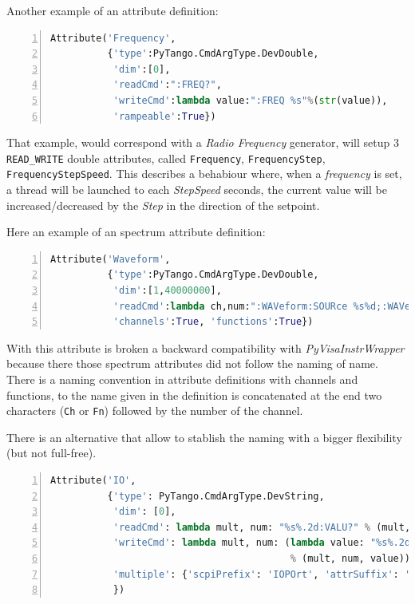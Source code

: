 \documentclass[a4paper,10pt]{article}
\begin{document}
Another example of an attribute definition:

\begin{lstlisting}[language=python, basicstyle=\ttfamily\small\footnotesize, numbers=left]
Attribute('Frequency',
          {'type':PyTango.CmdArgType.DevDouble,
           'dim':[0],
           'readCmd':":FREQ?",
           'writeCmd':lambda value:":FREQ %s"%(str(value)),
           'rampeable':True})
\end{lstlisting}

That example, would correspond with a \emph{Radio Frequency} generator, will setup 3 {\tt READ\_WRITE} double attributes, called {\tt Frequency}, {\tt FrequencyStep}, {\tt FrequencyStepSpeed}. This describes a behabiour where, when a \emph{frequency} is set, a thread will be launched to each \emph{StepSpeed} seconds, the current value will be increased/decreased by the \emph{Step} in the direction of the setpoint.

Here an example of an spectrum attribute definition:

\begin{lstlisting}[language=python, basicstyle=\ttfamily\small\footnotesize, numbers=left]
Attribute('Waveform',
          {'type':PyTango.CmdArgType.DevDouble,
           'dim':[1,40000000],
           'readCmd':lambda ch,num:":WAVeform:SOURce %s%d;:WAVeform:DATA?"%(ch,num),
           'channels':True, 'functions':True})
\end{lstlisting}

With this attribute is broken a backward compatibility with \emph{PyVisaInstrWrapper} because there those spectrum attributes did not follow the naming of name. There is a naming convention in attribute definitions with channels and functions, to the name given in the definition is concatenated at the end two characters ({\tt Ch} or {\tt Fn}) followed by the number of the channel.

There is an alternative that allow to stablish the naming with a bigger flexibility (but not full-free). 

\begin{lstlisting}[language=python, basicstyle=\ttfamily\small\footnotesize, numbers=left]
Attribute('IO',
          {'type': PyTango.CmdArgType.DevString,
           'dim': [0],
           'readCmd': lambda mult, num: "%s%.2d:VALU?" % (mult, num),
           'writeCmd': lambda mult, num: (lambda value: "%s%.2d:VALU %s"
                                          % (mult, num, value)),
           'multiple': {'scpiPrefix': 'IOPOrt', 'attrSuffix': 'Port'}
           })
\end{lstlisting}
\end{document}
